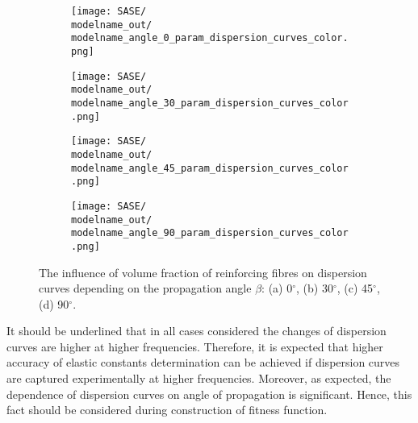 \documentclass[preprint,12pt]{elsarticle}
\begin{document}
\begin{figure} [h!]
	\centering
	\newcommand{\modelname}{SASE8}
	\begin{subfigure}[b]{0.49\textwidth}
		\centering
		\texttt{[image: SASE/\\modelname\_out/\\modelname\_angle\_0\_param\_dispersion\_curves\_color.png]}
		\caption{}
		\label{fig:vol0}
	\end{subfigure}
	\hfill
	\begin{subfigure}[b]{0.49\textwidth}
		\centering
		\texttt{[image: SASE/\\modelname\_out/\\modelname\_angle\_30\_param\_dispersion\_curves\_color.png]}
		\caption{}
		\label{fig:vol30}
	\end{subfigure}
	\begin{subfigure}[b]{0.49\textwidth}
		\centering
		\texttt{[image: SASE/\\modelname\_out/\\modelname\_angle\_45\_param\_dispersion\_curves\_color.png]}
		\caption{}
		\label{fig:vol45}
	\end{subfigure}
	\hfill
	\begin{subfigure}[b]{0.49\textwidth}
		\centering
		\texttt{[image: SASE/\\modelname\_out/\\modelname\_angle\_90\_param\_dispersion\_curves\_color.png]}
		\caption{}
		\label{fig:vol90}
	\end{subfigure}
	\caption{The influence of volume fraction of reinforcing fibres on dispersion curves depending on the propagation angle $\beta$: (a) 0$^{\circ}$, (b) 30$^{\circ}$, (c) 45$^{\circ}$, (d) 90$^{\circ}$.} 
	\label{fig:vol}
\end{figure}

\clearpage
It should be underlined that in all cases considered the changes of dispersion curves are higher at higher frequencies. Therefore, it is expected that higher accuracy of elastic constants determination can be achieved if dispersion curves are captured experimentally at higher frequencies. Moreover, as expected, the dependence of dispersion curves on angle of propagation is significant. Hence, this fact should be considered during construction of fitness function.
\end{document}
